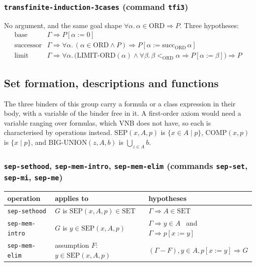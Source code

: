 \subsubsection*{\texttt{transfinite-induction-3cases} (command \texttt{tfi3})}

No argument, and the same goal shape
$\forall \alpha.\, \alpha \in \mathrm{ORD} \Rightarrow P$.  Three
hypotheses:
\[
\begin{array}{ll}
\text{base} & \Gamma \Longrightarrow P[\alpha{:=}0] \\[2pt]
\text{successor} & \Gamma \Longrightarrow \forall \alpha.\,
  (\alpha \in \mathrm{ORD} \wedge P) \Rightarrow P[\alpha{:=}\mathrm{succ}_{\mathrm{ORD}}\,\alpha] \\[2pt]
\text{limit} & \Gamma \Longrightarrow \forall \alpha.\,
  \bigl(\mathrm{LIMIT\text{-}ORD}(\alpha) \wedge
        \forall \beta.\, \beta <_{\mathrm{ORD}} \alpha \Rightarrow P[\alpha{:=}\beta]\bigr)
  \Rightarrow P
\end{array}
\]

\subsection{Set formation, descriptions and functions}

The three binders of this group carry a formula or a class expression in
their body, with a variable of the binder free in it.  A first-order
axiom would need a variable ranging over formulas, which VNB does not
have, so each is characterised by operations instead.
$\mathrm{SEP}(x, A, p)$ is $\{x \in A \mid p\}$,
$\mathrm{COMP}(x, p)$ is $\{x \mid p\}$, and
$\mathrm{BIG\text{-}UNION}(z, A, b)$ is $\bigcup_{z \in A} b$.

\subsubsection*{\texttt{sep-sethood}, \texttt{sep-mem-intro},
  \texttt{sep-mem-elim}
  (commands \texttt{sep-set}, \texttt{sep-mi}, \texttt{sep-me})}

\begin{center}
\begin{tabular}{@{}lll@{}}
\toprule
operation & applies to & hypotheses \\
\midrule
\texttt{sep-sethood} & $G$ is $\mathrm{SEP}(x,A,p) \in \mathrm{SET}$ & $\Gamma \Longrightarrow A \in \mathrm{SET}$ \\
\texttt{sep-mem-intro} & $G$ is $y \in \mathrm{SEP}(x,A,p)$ & $\Gamma \Longrightarrow y \in A$ \ and \ $\Gamma \Longrightarrow p[x{:=}y]$ \\
\texttt{sep-mem-elim} & assumption $F$: $y \in \mathrm{SEP}(x,A,p)$ & $(\Gamma - F), y \in A, p[x{:=}y] \Longrightarrow G$ \\
\bottomrule
\end{tabular}
\end{center}

